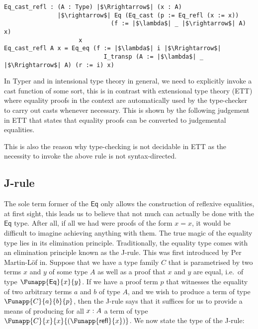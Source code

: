 \documentclass[12pt,twoside,maitrise]{dms}
\theoremstyle{definition}
\numberwithin{equation}{section}
\numberwithin{table}{chapter}
\numberwithin{figure}{chapter}
\newcommand\kw[1] {\textsf{#1}}
\begin{document}
\begin{verbatim}
Eq_cast_refl : (A : Type) |$\Rrightarrow$| (x : A)
               |$\rightarrow$| Eq (Eq_cast (p := Eq_refl (x := x))
                              (f := |$\lambda$| _ |$\rightarrow$| A) x)
                     x
Eq_cast_refl A x = Eq_eq (f := |$\lambda$| i |$\Rrightarrow$|
                            I_transp (A := |$\lambda$| _ |$\Rrightarrow$| A) (r := i) x)
\end{verbatim}


In Typer and in intensional type theory in general, we need to explicitly invoke
a cast function of some sort, this is in contrast with extensional type theory
(ETT)\cite{martin1982constructive} where equality proofs in the context are
automatically used by the type-checker to carry out casts whenever necessary.
This is shown by the following judgement in ETT that states that equality proofs
can be converted to judgemental equalities.

\begin{prooftree*}
  \hypo{\oftype{\ctx}{t}{\Funapp{\kw{Eq}}{a}{b}}}
\end{prooftree*}

This is also the reason why type-checking is not decidable in ETT as the
necessity to invoke the above rule is not syntax-directed.


\subsection*{J-rule}\label{subsec:j-rule}
The sole term former of the $\kw{Eq}$ only allows the construction of reflexive
equalities, at first sight, this leads us to believe that not much can actually
be done with the $\kw{Eq}$ type. After all, if all we had were proofs of the
form $x = x$, it would be difficult to imagine achieving anything with them. The
true magic of the equality type lies in its elimination principle.
Traditionally, the equality type comes with an elimination principle known as
the J-rule. This was first introduced by Per Martin-Löf
in\cite{martin1975intuitionistic}. Suppose that we have a type family $C$ that
is parametrised by two terms $x$ and $y$ of some type $A$ as well as a proof
that $x$ and $y$ are equal, i.e.\ of type $\Funapp{\kw{Eq}}{x}{y}$. If we have
a proof term $p$ that witnesses the equality of two arbitrary terms $a$ and
$b$ of type $A$, and we wish to produce a term of type $\Funapp{C}{a}{b}{p}$,
then the J-rule says that it suffices for us to provide a means of producing for
all $\oftype{x}{A}$ a term of type $\Funapp{C}{x}{x}{(\Funapp{\kw{refl}}{x})}$.
We now state the type of the J-rule:
\end{document}
